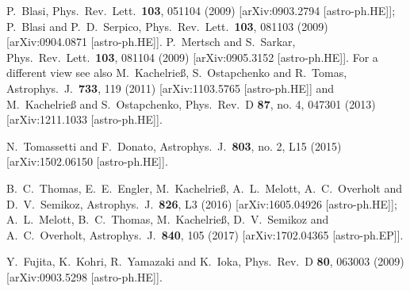 \documentclass[prd,aps,twocolumn]{revtex4}
\begin{document}
\begin{thebibliography}{99}
  P.~Blasi,
  Phys.\ Rev.\ Lett.\  {\bf 103}, 051104 (2009)
  [arXiv:0903.2794 [astro-ph.HE]];
P.~Blasi and P.~D.~Serpico,
  Phys.\ Rev.\ Lett.\  {\bf 103}, 081103 (2009)
  [arXiv:0904.0871 [astro-ph.HE]].
P.~Mertsch and S.~Sarkar,
  Phys.\ Rev.\ Lett.\  {\bf 103}, 081104 (2009)
   [arXiv:0905.3152 [astro-ph.HE]].
For a different view see also 
M.~Kachelrie\ss, S.~Ostapchenko and R.~Tomas,
  Astrophys.\ J.\  {\bf 733}, 119 (2011)
 [arXiv:1103.5765 [astro-ph.HE]] and
M.~Kachelrie{\ss} and S.~Ostapchenko,
  Phys.\ Rev.\ D {\bf 87}, no. 4, 047301 (2013)
  [arXiv:1211.1033 [astro-ph.HE]].


   N.~Tomassetti and F.~Donato,
  Astrophys.\ J.\  {\bf 803}, no. 2, L15 (2015)
  [arXiv:1502.06150 [astro-ph.HE]].





B.~C.~Thomas, E.~E.~Engler, M.~Kachelrie\ss, A.~L.~Melott, A.~C.~Overholt and D.~V.~Semikoz,
  Astrophys.\ J.\  {\bf 826}, L3 (2016)
  [arXiv:1605.04926 [astro-ph.HE]];
 A.~L.~Melott, B.~C.~Thomas, M.~Kachelrie\ss, D.~V.~Semikoz and A.~C.~Overholt,
  Astrophys.\ J.\  {\bf 840}, 105 (2017)
  [arXiv:1702.04365 [astro-ph.EP]].


  Y.~Fujita, K.~Kohri, R.~Yamazaki and K.~Ioka,
  Phys.\ Rev.\ D {\bf 80}, 063003 (2009)
  [arXiv:0903.5298 [astro-ph.HE]].



\end{thebibliography}
\end{document}
